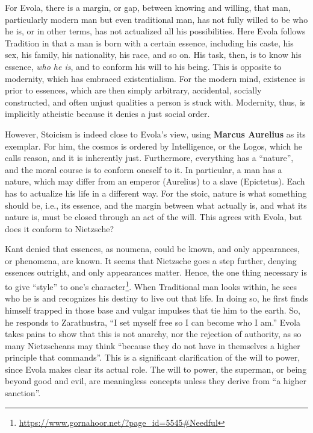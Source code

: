 For Evola, there is a margin, or gap, between knowing and willing, that man, particularly modern man but even traditional man, has not fully willed to be who he is, or in other terms, has not actualized all his possibilities. Here Evola follows Tradition in that a man is born with a certain essence, including his caste, his sex, his family, his nationality, his race, and so on. His task, then, is to know his essence, \emph{who he is}, and to conform his will to his being. This is opposite to modernity, which has embraced existentialism. For the modern mind, existence is prior to essences, which are then simply arbitrary, accidental, socially constructed, and often unjust qualities a person is stuck with. Modernity, thus, is implicitly atheistic because it denies a just social order.

However, Stoicism is indeed close to Evola's view, using \textbf{Marcus Aurelius} as its exemplar. For him, the cosmos is ordered by Intelligence, or the Logos, which he calls reason, and it is inherently just. Furthermore, everything has a ``nature'', and the moral course is to conform oneself to it. In particular, a man has a nature, which may differ from an emperor (Aurelius) to a slave (Epictetus). Each has to actualize his life in a different way. For the stoic, nature is what something should be, i.e., its essence, and the margin between what actually is, and what its nature is, must be closed through an act of the will. This agrees with Evola, but does it conform to Nietzsche?

Kant denied that essences, as noumena, could be known, and only appearances, or phenomena, are known. It seems that Nietzsche goes a step further, denying essences outright, and only appearances matter. Hence, the one thing necessary is to give ``style'' to one's character\footnote{\url{https://www.gornahoor.net/?page\_id=5545\#Needful}}. When Traditional man looks within, he sees who he is and recognizes his destiny to live out that life. In doing so, he first finds himself trapped in those base and vulgar impulses that tie him to the earth. So, he responds to Zarathustra, ``I set myself free so I can become who I am.'' Evola takes pains to show that this is not anarchy, nor the rejection of authority, as so many Nietzscheans may think ``because they do not have in themselves a higher principle that commands''. This is a significant clarification of the will to power, since Evola makes clear its actual role. The will to power, the superman, or being beyond good and evil, are meaningless concepts unless they derive from ``a higher sanction''.

